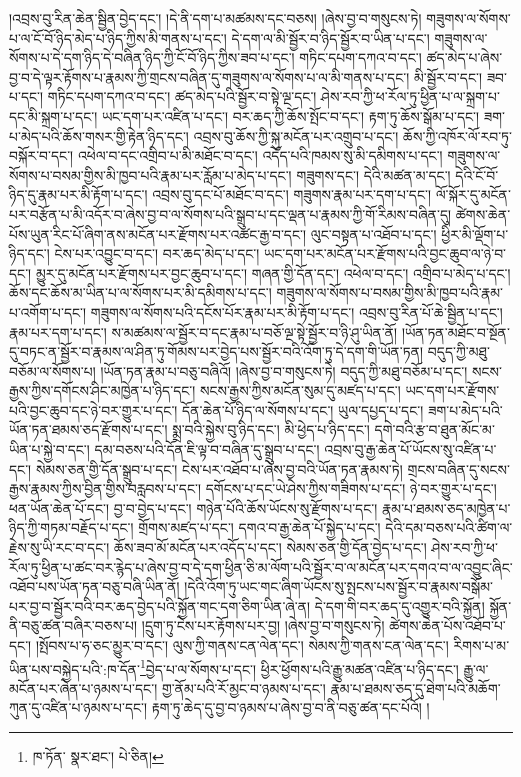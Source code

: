 །འབྲས་བུ་རིན་ཆེན་སྦྱིན་བྱེད་དང་། །དེ་ནི་དག་པ་མཚམས་དང་བཅས། །ཞེས་བྱ་བ་གསུངས་ཏེ། གཟུགས་ལ་སོགས་པ་ལ་ངོ་བོ་ཉིད་མེད་པ་ཉིད་ཀྱིས་མི་གནས་པ་དང་། དེ་དག་ལ་མི་སྦྱོར་བ་ཉིད་སྦྱོར་བ་ཡིན་པ་དང་། གཟུགས་ལ་སོགས་པ་དེ་དག་ཉིད་དེ་བཞིན་ཉིད་ཀྱི་ངོ་བོ་ཉིད་ཀྱིས་ཟབ་པ་དང་། གཏིང་དཔག་དཀའ་བ་དང་། ཚད་མེད་པ་ཞེས་བྱ་བ་དེ་ལྟར་རྟོགས་པ་རྣམས་ཀྱི་གྲངས་བཞིན་དུ་གཟུགས་ལ་སོགས་པ་ལ་མི་གནས་པ་དང་། མི་སྦྱོར་བ་དང་། ཟབ་པ་དང་། གཏིང་དཔག་དཀའ་བ་དང་། ཚད་མེད་པའི་སྦྱོར་བ་སྟེ་ལྔ་དང་། ཤེས་རབ་ཀྱི་ཕ་རོལ་ཏུ་ཕྱིན་པ་ལ་སྐྲག་པ་དང་མི་སྐྲག་པ་དང་། ཡང་དག་པར་འཛིན་པ་དང་། བར་ཆད་ཀྱི་ཆོས་སྤོང་བ་དང་། རྟག་ཏུ་ཆོས་སྒོམ་པ་དང་། ཟག་པ་མེད་པའི་ཆོས་གསར་གྱི་རྟེན་ཉིད་དང་། འབྲས་བུ་ཆོས་ཀྱི་སྐུ་མངོན་པར་འགྲུབ་པ་དང་། ཆོས་ཀྱི་འཁོར་ལོ་རབ་ཏུ་བསྐོར་བ་དང་། འཕེལ་བ་དང་འགྲིབ་པ་མི་མཐོང་བ་དང་། འདོད་པའི་ཁམས་སུ་མི་དམིགས་པ་དང་། གཟུགས་ལ་སོགས་པ་བསམ་གྱིས་མི་ཁྱབ་པའི་རྣམ་པར་རློམ་པ་མེད་པ་དང་། གཟུགས་དང་། དེའི་མཚན་མ་དང་། དེའི་ངོ་བོ་ཉིད་དུ་རྣམ་པར་མི་རྟོག་པ་དང་། འབྲས་བུ་དང་པོ་མཐོང་བ་དང་། གཟུགས་རྣམ་པར་དག་པ་དང་། ལོ་སྐོར་དུ་མངོན་པར་བརྩོན་པ་མི་འདོར་བ་ཞེས་བྱ་བ་ལ་སོགས་པའི་སྒྲུབ་པ་དང་ལྡན་པ་རྣམས་ཀྱི་གོ་རིམས་བཞིན་དུ། ཚེགས་ཆེན་པོས་ཡུན་རིང་པོ་ཞིག་ནས་མངོན་པར་རྫོགས་པར་འཚང་རྒྱ་བ་དང་། ལུང་བསྟན་པ་འཐོབ་པ་དང་། ཕྱིར་མི་ལྡོག་པ་ཉིད་དང་། ངེས་པར་འབྱུང་བ་དང་། བར་ཆད་མེད་པ་དང་། ཡང་དག་པར་མངོན་པར་རྫོགས་པའི་བྱང་ཆུབ་ལ་ཉེ་བ་དང་། མྱུར་དུ་མངོན་པར་རྫོགས་པར་བྱང་ཆུབ་པ་དང་། གཞན་གྱི་དོན་དང་། འཕེལ་བ་དང་། འགྲིབ་པ་མེད་པ་དང་། ཆོས་དང་ཆོས་མ་ཡིན་པ་ལ་སོགས་པར་མི་དམིགས་པ་དང་། གཟུགས་ལ་སོགས་པ་བསམ་གྱིས་མི་ཁྱབ་པའི་རྣམ་པ་འགོག་པ་དང་། གཟུགས་ལ་སོགས་པའི་དངོས་པོར་རྣམ་པར་མི་རྟོག་པ་དང་། འབྲས་བུ་རིན་པོ་ཆེ་སྦྱིན་པ་དང་། རྣམ་པར་དག་པ་དང་། ས་མཚམས་ལ་སྦྱོར་བ་དང་རྣམ་པ་བཅོ་ལྔ་སྟེ་སྦྱོར་བ་ཉི་ཤུ་ཡིན་ནོ། །ཡོན་ཏན་མཐོང་བ་སྔོན་དུ་བཏང་ན་སྦྱོར་བ་རྣམས་ལ་ཤིན་ཏུ་གོམས་པར་བྱེད་པས་སྦྱོར་བའི་འོག་ཏུ་དེ་དག་གི་ཡོན་ཏན། བདུད་ཀྱི་མཐུ་བཅོམ་ལ་སོགས་པ། །ཡོན་ཏན་རྣམ་པ་བཅུ་བཞིའོ། །ཞེས་བྱ་བ་གསུངས་ཏེ། བདུད་ཀྱི་མཐུ་བཅོམ་པ་དང་། སངས་རྒྱས་ཀྱིས་དགོངས་ཤིང་མཁྱེན་པ་ཉིད་དང་། སངས་རྒྱས་ཀྱིས་མངོན་སུམ་དུ་མཛད་པ་དང་། ཡང་དག་པར་རྫོགས་པའི་བྱང་ཆུབ་དང་ཉེ་བར་གྱུར་པ་དང་། དོན་ཆེན་པོ་ཉིད་ལ་སོགས་པ་དང་། ཡུལ་དཔྱད་པ་དང་། ཟག་པ་མེད་པའི་ཡོན་ཏན་ཐམས་ཅད་རྫོགས་པ་དང་། སྨྲ་བའི་སྐྱེས་བུ་ཉིད་དང་། མི་ཕྱེད་པ་ཉིད་དང་། དགེ་བའི་རྩ་བ་ཐུན་མོང་མ་ཡིན་པ་སྐྱེ་བ་དང་། དམ་བཅས་པའི་དོན་ཇི་ལྟ་བ་བཞིན་དུ་སྒྲུབ་པ་དང་། འབྲས་བུ་རྒྱ་ཆེན་པོ་ཡོངས་སུ་འཛིན་པ་དང་། སེམས་ཅན་གྱི་དོན་སྒྲུབ་པ་དང་། ངེས་པར་འཐོབ་པ་ཞེས་བྱ་བའི་ཡོན་ཏན་རྣམས་ཏེ། གྲངས་བཞིན་དུ་སངས་རྒྱས་རྣམས་ཀྱིས་བྱིན་གྱིས་བརླབས་པ་དང་། དགོངས་པ་དང་ཡེ་ཤེས་ཀྱིས་གཟིགས་པ་དང་། ཉེ་བར་གྱུར་པ་དང་། ཕན་ཡོན་ཆེན་པོ་དང་། བྱ་བ་བྱེད་པ་དང་། གཉེན་པོའི་ཆོས་ཡོངས་སུ་རྫོགས་པ་དང་། རྣམ་པ་ཐམས་ཅད་མཁྱེན་པ་ཉིད་ཀྱི་གཏམ་བརྗོད་པ་དང་། གྲོགས་མཛད་པ་དང་། དགའ་བ་རྒྱ་ཆེན་པོ་སྐྱེད་པ་དང་། དེའི་དམ་བཅས་པའི་ཚིག་ལ་རྗེས་སུ་ཡི་རང་བ་དང་། ཆོས་ཟབ་མོ་མངོན་པར་འདོད་པ་དང་། སེམས་ཅན་གྱི་དོན་བྱེད་པ་དང་། ཤེས་རབ་ཀྱི་ཕ་རོལ་ཏུ་ཕྱིན་པ་ཚང་བར་རྙེད་པ་ཞེས་བྱ་བ་དེ་དག་ཕྱིན་ཅི་མ་ལོག་པའི་སྦྱོར་བ་ལ་མངོན་པར་དགའ་བ་ལ་འབྱུང་ཞིང་འཐོབ་པས་ཡོན་ཏན་བཅུ་བཞི་ཡིན་ནོ། །དེའི་འོག་ཏུ་ཡང་གང་ཞིག་ཡོངས་སུ་སྤངས་པས་སྦྱོར་བ་རྣམས་བསྒོམ་པར་བྱ་བ་སྦྱོར་བའི་བར་ཆད་བྱེད་པའི་སྐྱོན་གང་དག་ཅིག་ཡིན་ཞེ་ན། དེ་དག་གི་བར་ཆད་དུ་འགྱུར་བའི་སྐྱོན། སྐྱོན་ནི་བཅུ་ཚན་བཞིར་བཅས་པ། །དྲུག་ཏུ་ངེས་པར་རྟོགས་པར་བྱ། །ཞེས་བྱ་བ་གསུངས་ཏེ། ཚེགས་ཆེན་པོས་འཐོབ་པ་དང་། །སྤོབས་པ་ཧ་ཅང་མྱུར་བ་དང་། ལུས་ཀྱི་གནས་ངན་ལེན་དང་། སེམས་ཀྱི་གནས་ངན་ལེན་དང་། རིགས་པ་མ་ཡིན་པས་བསྐྱེད་པའི་:ཁ་དོན་\footnote{ཁ་ཏོན་  སྣར་ཐང་།  པེ་ཅིན། }བྱེད་པ་ལ་སོགས་པ་དང་། ཕྱིར་ཕྱོགས་པའི་རྒྱུ་མཚན་འཛིན་པ་ཉིད་དང་། རྒྱུ་ལ་མངོན་པར་ཞེན་པ་ཉམས་པ་དང་། གྱ་ནོམ་པའི་རོ་མྱང་བ་ཉམས་པ་དང་། རྣམ་པ་ཐམས་ཅད་དུ་ཐེག་པའི་མཆོག་ཀུན་དུ་འཛིན་པ་ཉམས་པ་དང་། རྟག་ཏུ་ཆེད་དུ་བྱ་བ་ཉམས་པ་ཞེས་བྱ་བ་ནི་བཅུ་ཚན་དང་པོའོ། །

